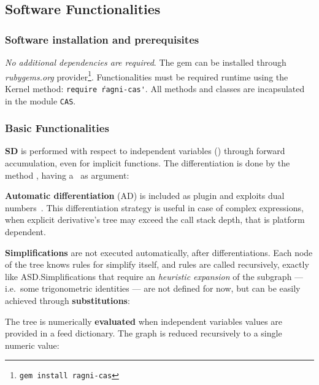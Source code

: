 \subsection{Software Functionalities}
\label{sec:functionalities}

\subsubsection{Software installation and prerequisites}

\emph{No additional dependencies are required}. The gem can be installed through \emph{rubygems.org} provider\footnote{\texttt{gem install ragni-cas}}. Functionalities must be required runtime using the Kernel method: \texttt{require \'ragni-cas\'}. All methods and classes are incapsulated in the module \texttt{CAS}.

\subsubsection{Basic Functionalities}
\textbf{SD} is performed with respect to independent variables (\CASVariable) through forward accumulation, even for implicit functions. The differentiation is done by the method \CASOpdiff, having a \CASVariable~as argument:

\noindent%


\textbf{Automatic differentiation} (AD) is included as plugin and exploits dual numbers~\cite{bartholomew2000automatic}. This differentiation strategy is useful in case of complex expressions, when explicit derivative's tree may exceed the call stack depth, that is platform dependent.

\textbf{Simplifications} are not executed automatically, after differentiations. Each node of the tree knows rules for simplify itself, and rules are called recursively, exactly like ASD.\@ Simplifications that require an \emph{heuristic expansion} of the subgraph --- i.e.\ some trigonometric identities --- are not defined for now, but can be easily achieved through \textbf{substitutions}:

\noindent%


The tree is numerically \textbf{evaluated} when independent variables values are provided in a feed dictionary. The graph is reduced recursively to a single numeric value:

